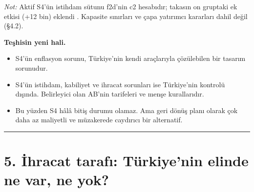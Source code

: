 \endgroup

\emph{Not:} Aktif S4'ün istihdam sütunu f2d'nin c2 hesabıdır; takasın on gruptaki ek etkisi (+12 bin) eklendi \etiketT{}. Kapasite sınırları ve çapa yatırımcı kararları dahil değil (§4.2).

\textbf{Teşhisin yeni hali.}

\begin{itemize}
\tightlist
\item
  S4'ün enflasyon sorunu, Türkiye'nin kendi araçlarıyla çözülebilen bir tasarım sorunudur.
\item
  S4'ün istihdam, kabiliyet ve ihracat sorunları ise Türkiye'nin kontrolü dışında. Belirleyici olan AB'nin tarifeleri ve menşe kurallarıdır.
\item
  Bu yüzden S4 hâlâ bitiş durumu olamaz. Ama geri dönüş planı olarak çok daha az maliyetli ve müzakerede caydırıcı bir alternatif.
\end{itemize}

\begin{center}\rule{0.5\linewidth}{0.5pt}\end{center}

\hypertarget{02a_politika_uzayi-5-iux307hracat-tarafux131-tuxfcrkiyenin-elinde-ne-var-ne-yok}{%
\section{5. İhracat tarafı: Türkiye'nin elinde ne var, ne yok?}\label{02a_politika_uzayi-5-iux307hracat-tarafux131-tuxfcrkiyenin-elinde-ne-var-ne-yok}}

\begingroup\gbtablo\small

